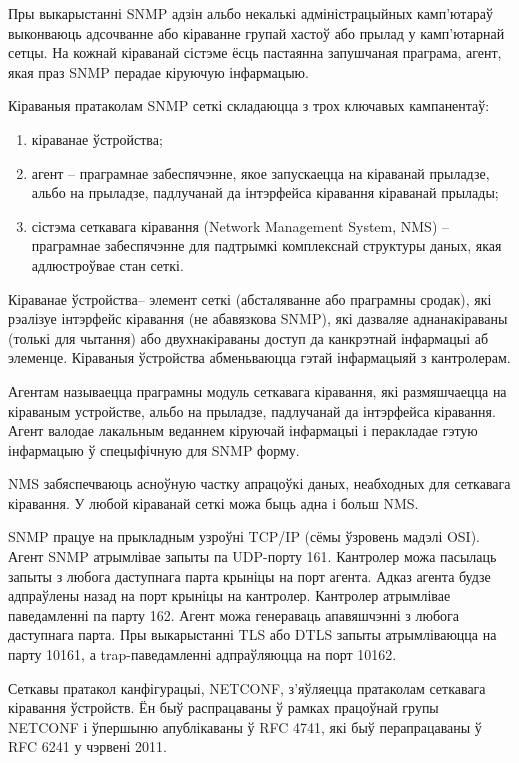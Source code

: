 Пры выкарыстанні SNMP адзін альбо некалькі адміністрацыйных камп'ютараў выконваюць адсочванне або кіраванне групай хастоў або прылад у камп'ютарнай сетцы. На кожнай кіраванай сістэме ёсць пастаянна запушчаная праграма, агент, якая праз SNMP перадае кіруючую інфармацыю.

Кіраваныя пратаколам SNMP сеткі складаюцца з трох ключавых кампанентаў:
\begin{enumerate}
    \item кіраванае ўстройства;
    \item агент -- праграмнае забеспячэнне, якое запускаецца на кіраванай прыладзе, альбо на прыладзе, падлучанай да інтэрфейса кіравання кіраванай прылады;
    \item сістэма сеткавага кіравання (Network Management System, NMS) -- праграмнае забеспячэнне для падтрымкі комплекснай структуры даных, якая адлюстроўвае стан сеткі.
\end{enumerate}

Кіраванае ўстройства-- элемент сеткі (абсталяванне або праграмны сродак), які рэалізуе інтэрфейс кіравання (не абавязкова SNMP), які дазваляе аднанакіраваны (толькі для чытання) або двухнакіраваны доступ да канкрэтнай інфармацыі аб элеменце. Кіраваныя ўстройства абменьваюцца гэтай інфармацыяй з кантролерам.

Агентам называецца праграмны модуль сеткавага кіравання, які размяшчаецца на кіраваным устройстве, альбо на прыладзе, падлучанай да інтэрфейса кіравання. Агент валодае лакальным веданнем кіруючай інфармацыі і перакладае гэтую інфармацыю ў спецыфічную для SNMP форму.

NMS забяспечваюць асноўную частку апрацоўкі даных, неабходных для сеткавага кіравання. У любой кіраванай сеткі можа быць адна і больш NMS.

SNMP працуе на прыкладным узроўні TCP/IP (сёмы ўзровень мадэлі OSI). Агент SNMP атрымлівае запыты па UDP-порту 161. Кантролер можа пасылаць запыты з любога даступнага парта крыніцы на порт агента. Адказ агента будзе адпраўлены назад на порт крыніцы на кантролер. Кантролер атрымлівае паведамленні па парту 162. Агент можа генераваць апавяшчэнні з любога даступнага парта. Пры выкарыстанні TLS або DTLS запыты атрымліваюцца на парту 10161, а trap-паведамленні адпраўляюцца на порт 10162.

Сеткавы пратакол канфігурацыі, NETCONF, з'яўляецца пратаколам сеткавага кіравання ўстройств. Ён быў распрацаваны ў рамках працоўнай групы NETCONF і ўпершыню апублікаваны ў RFC 4741, які быў перапрацаваны ў RFC 6241 у чэрвені 2011.

